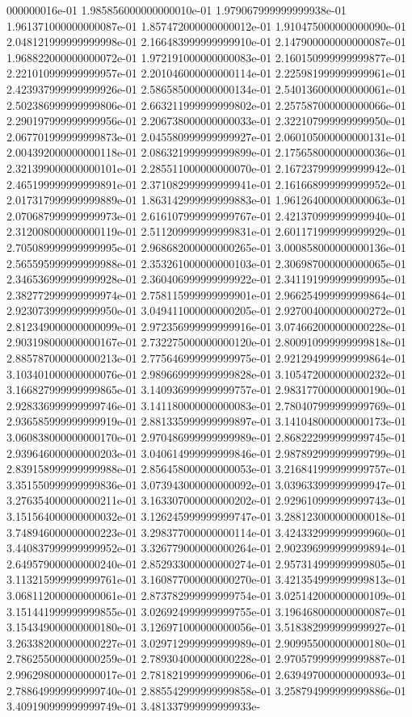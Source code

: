 000000016e-01	1.985856000000000010e-01	1.979067999999999938e-01	1.961371000000000087e-01	1.857472000000000012e-01	1.910475000000000090e-01	2.048121999999999998e-01	2.166483999999999910e-01	2.147900000000000087e-01	1.968822000000000072e-01	1.972191000000000083e-01	2.160150999999999877e-01	2.221010999999999957e-01	2.201046000000000114e-01	2.225981999999999961e-01	2.423937999999999926e-01	2.586585000000000134e-01	2.540136000000000061e-01	2.502386999999999806e-01	2.663211999999999802e-01	2.257587000000000066e-01	2.290197999999999956e-01	2.206738000000000033e-01	2.322107999999999950e-01	2.067701999999999873e-01	2.045580999999999927e-01	2.060105000000000131e-01	2.004392000000000118e-01	2.086321999999999899e-01	2.175658000000000036e-01	2.321399000000000101e-01	2.285511000000000070e-01	2.167237999999999942e-01	2.465199999999999891e-01	2.371082999999999941e-01	2.161668999999999952e-01	2.017317999999999889e-01	1.863142999999999883e-01	1.961264000000000063e-01	2.070687999999999973e-01	2.616107999999999767e-01	2.421370999999999940e-01	2.312008000000000119e-01	2.511209999999999831e-01	2.601171999999999929e-01	2.705089999999999995e-01	2.968682000000000265e-01	3.000858000000000136e-01	2.565595999999999988e-01	2.353261000000000103e-01	2.306987000000000065e-01	2.346536999999999928e-01	2.360406999999999922e-01	2.341191999999999995e-01	2.382772999999999974e-01	2.758115999999999901e-01	2.966254999999999864e-01	2.923073999999999950e-01	3.049411000000000205e-01	2.927004000000000272e-01	2.812349000000000099e-01	2.972356999999999916e-01	3.074662000000000228e-01	2.903198000000000167e-01	2.732275000000000120e-01	2.800910999999999818e-01	2.885787000000000213e-01	2.775646999999999975e-01	2.921294999999999864e-01	3.103401000000000076e-01	2.989669999999999828e-01	3.105472000000000232e-01	3.166827999999999865e-01	3.140936999999999757e-01	2.983177000000000190e-01	2.928336999999999746e-01	3.141180000000000083e-01	2.780407999999999769e-01	2.936585999999999919e-01	2.881335999999999897e-01	3.141048000000000173e-01	3.060838000000000170e-01	2.970486999999999989e-01	2.868222999999999745e-01	2.939646000000000203e-01	3.040614999999999846e-01	2.987892999999999799e-01	2.839158999999999988e-01	2.856458000000000053e-01	3.216841999999999757e-01	3.351550999999999836e-01	3.073943000000000092e-01	3.039633999999999947e-01	3.276354000000000211e-01	3.163307000000000202e-01	2.929610999999999743e-01	3.151564000000000032e-01	3.126245999999999747e-01	3.288123000000000018e-01	3.748946000000000223e-01	3.298377000000000114e-01	3.424332999999999960e-01	3.440837999999999952e-01	3.326779000000000264e-01	2.902396999999999894e-01	2.649579000000000240e-01	2.852933000000000274e-01	2.957314999999999805e-01	3.113215999999999761e-01	3.160877000000000270e-01	3.421354999999999813e-01	3.068112000000000061e-01	2.873782999999999754e-01	3.025142000000000109e-01	3.151441999999999855e-01	3.026924999999999755e-01	3.196468000000000087e-01	3.154349000000000180e-01	3.126971000000000056e-01	3.518382999999999927e-01	3.263382000000000227e-01	3.029712999999999989e-01	2.909955000000000180e-01	2.786255000000000259e-01	2.789304000000000228e-01	2.970579999999999887e-01	2.996298000000000017e-01	2.781821999999999906e-01	2.639497000000000093e-01	2.788649999999999740e-01	2.885542999999999858e-01	3.258794999999999886e-01	3.409190999999999749e-01	3.481337999999999933e-